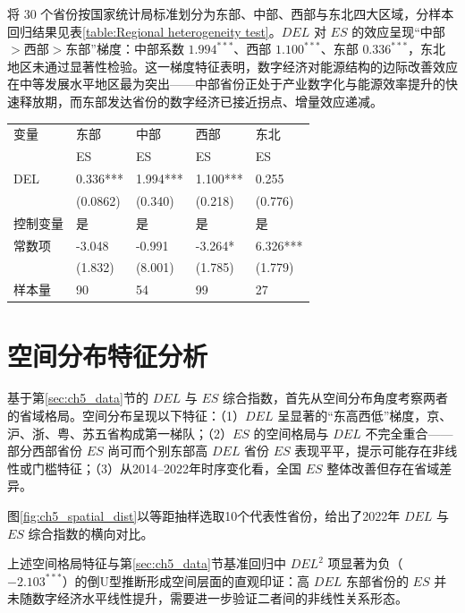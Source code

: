 将 30 个省份按国家统计局标准划分为东部、中部、西部与东北四大区域，分样本回归结果见表\ref{table:Regional heterogeneity test}。$DEL$ 对 $ES$ 的效应呈现``中部$>$西部$>$东部''梯度：中部系数 $1.994^{***}$、西部 $1.100^{***}$、东部 $0.336^{***}$，东北地区未通过显著性检验。这一梯度特征表明，数字经济对能源结构的边际改善效应在中等发展水平地区最为突出——中部省份正处于产业数字化与能源效率提升的快速释放期，而东部发达省份的数字经济已接近拐点、增量效应递减。

\begin{center}
    \begin{tabular}{lllll}
    \hline
    变量 & 东部 & 中部 & 西部 & 东北 \\
    ~ & ES & ES & ES & ES \\
    \hline
    DEL & 0.336*** & 1.994*** & 1.100*** & 0.255 \\
    ~ & (0.0862) & (0.340) & (0.218) & (0.776) \\
    控制变量 & 是 & 是 & 是 & 是 \\
    常数项 & -3.048 & -0.991 & -3.264* & 6.326*** \\
    ~ & (1.832) & (8.001) & (1.785) & (1.779) \\
    样本量 & 90 & 54 & 99 & 27 \\
    \hline
    \end{tabular}
\end{center}

\medskip
\section{空间分布特征分析}
\label{sec:ch5_spatial}

基于第\ref{sec:ch5_data}节的 $DEL$ 与 $ES$ 综合指数，首先从空间分布角度考察两者的省域格局。空间分布呈现以下特征：（1）$DEL$ 呈显著的``东高西低''梯度，京、沪、浙、粤、苏五省构成第一梯队；（2）$ES$ 的空间格局与 $DEL$ 不完全重合——部分西部省份 $ES$ 尚可而个别东部高 $DEL$ 省份 $ES$ 表现平平，提示可能存在非线性或门槛特征；（3）从2014--2022年时序变化看，全国 $ES$ 整体改善但存在省域差异。

图\ref{fig:ch5_spatial_dist}以等距抽样选取10个代表性省份，给出了2022年 $DEL$ 与 $ES$ 综合指数的横向对比。

上述空间格局特征与第\ref{sec:ch5_data}节基准回归中 $DEL^2$ 项显著为负（$-2.103^{***}$）的倒U型推断形成空间层面的直观印证：高 $DEL$ 东部省份的 $ES$ 并未随数字经济水平线性提升，需要进一步验证二者间的非线性关系形态。

